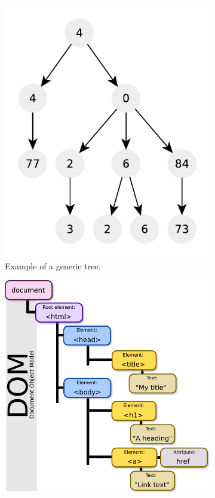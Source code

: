 \begin{figure}
	\vspace*{-0.5in}
	\centering
	\begin{subfigure}[t]{0.46\textwidth}
		\includegraphics[width=1\linewidth]{sources/verify_BST/images/generic_tree}
		\caption[]{Example of a generic tree.}
		\label{fig:verify:generic_tree}
	 \end{subfigure}
	\hfill
	\begin{subfigure}[t]{0.46\textwidth}
		\includegraphics[width=1\linewidth]{sources/verify_BST/images/DOM-model}

\end{subfigure}
\end{figure}
